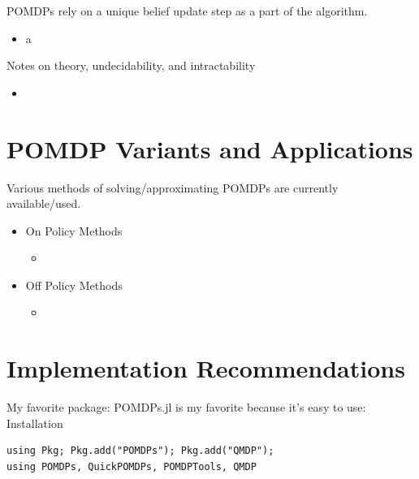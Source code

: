 \documentclass[presentation, smaller]{beamer}
\begin{document}
\begin{frame}[label={sec:orgce381a3}]{POMDPs rely on a unique belief update step as a part of the algorithm.}
\begin{itemize}
\item a
\end{itemize}
\end{frame}

\begin{frame}[label={sec:orga4e21a8}]{Notes on theory, undecidability, and intractability}
\begin{itemize}
\item 
\end{itemize}
\end{frame}

\section{POMDP Variants and Applications}
\label{sec:org7111265}

\begin{frame}[label={sec:orgd98e428}]{Various methods of solving/approximating POMDPs are currently available/used.}
\begin{itemize}
\item On Policy Methods
\begin{itemize}
\item 
\end{itemize}
\item Off Policy Methods
\begin{itemize}
\item 
\end{itemize}
\end{itemize}
\end{frame}

\section{Implementation Recommendations}
\label{sec:orgdc5a2b6}

\begin{frame}[label={sec:org763fe5c},fragile]{My favorite package: POMDPs.jl is my favorite because it's easy to use: Installation}
 \begin{verbatim}
using Pkg; Pkg.add("POMDPs"); Pkg.add("QMDP");
using POMDPs, QuickPOMDPs, POMDPTools, QMDP
\end{verbatim}
\end{frame}
\end{document}
